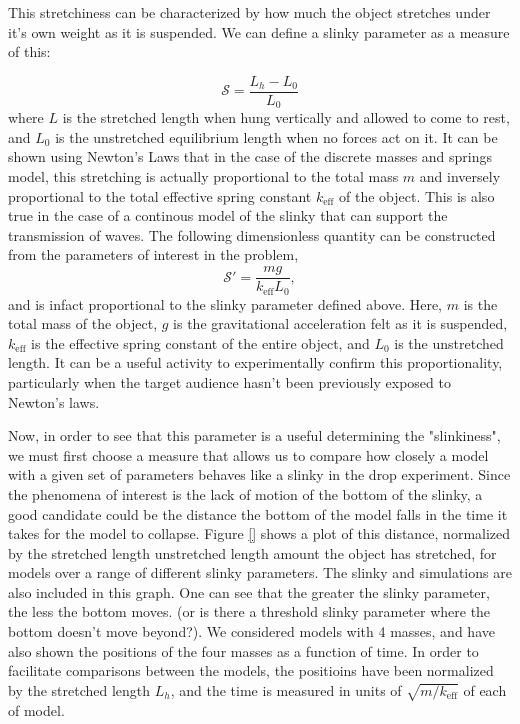 \documentclass[prb,preprint]{revtex4-1}
\begin{document}
This stretchiness can be characterized by how much the object stretches
under it's own weight as it is suspended.   We can define a slinky parameter as a measure of this:

\begin{equation}
\mathcal{S}=\frac{L_h-L_0}{L_0}
\end{equation}
where $L$ is the stretched length when hung vertically and allowed to come to rest, and $L_0$ is the unstretched equilibrium length
when no forces act on it.  It can be shown using Newton's Laws that in the case of the discrete masses and springs model,
this stretching is actually proportional to the total mass $m$ and inversely proportional to the total effective spring constant $k_{\text{eff}}$ of the object.
This is also true in the case of a continous model of the slinky that can support the transmission of waves.  The following dimensionless quantity
can be constructed from the parameters of interest in the problem,
\begin{equation}
\mathcal{S'}=\frac{m g}{k_\text{eff} L_0 },
\end{equation}
 and is infact proportional to the  slinky parameter defined above.  Here, $m$ is the total mass of the object, $g$ is the gravitational acceleration felt as it is suspended, $k_\text{eff}$ is the effective spring constant of the entire object, and $L_0$ is the unstretched length.  It can be a useful activity to experimentally 
confirm this proportionality, particularly when the target audience hasn't been previously exposed to Newton's laws.

Now, in order to see that this parameter is a useful determining the "slinkiness", we must first choose a measure that allows us to compare how closely a model
with a given set of parameters behaves like a slinky in the drop experiment.  Since the phenomena of interest is the lack of motion of the bottom of the slinky, 
a good candidate could be the distance the bottom of the model falls in the time it takes for the model to collapse.  Figure \ref{} shows a plot of this distance, normalized by the stretched length unstretched length amount the object has stretched, for models over a range of different slinky parameters.  The slinky and simulations are also included in this graph.  One can see that the greater the slinky parameter, the less the bottom moves.  (or is there a threshold slinky parameter where  the bottom doesn't move beyond?).  We considered models with 4 masses, and have also shown the positions of the four masses as a function of time.  In order to facilitate comparisons between the models, the positioins have been normalized by the stretched length $L_h$, and the time is measured in units of $\sqrt{m/k_{\text{eff}}}$ of each of model.  
\end{document}
